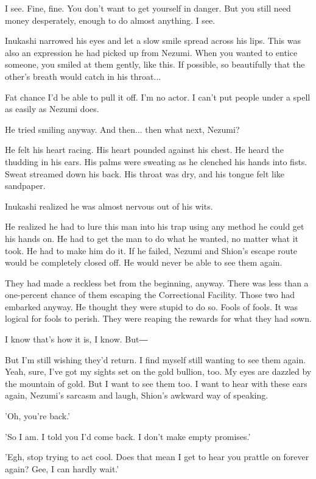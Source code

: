 I see. Fine, fine. You don't want to get yourself in danger. But you
still need money desperately, enough to do almost anything. I see.

Inukashi narrowed his eyes and let a slow smile spread across his lips.
This was also an expression he had picked up from Nezumi. When you
wanted to entice someone, you smiled at them gently, like this. If
possible, so beautifully that the other's breath would catch in his
throat...

Fat chance I'd be able to pull it off. I'm no actor. I can't put people
under a spell as easily as Nezumi does.

He tried smiling anyway. And then... then what next, Nezumi?

He felt his heart racing. His heart pounded against his chest. He heard
the thudding in his ears. His palms were sweating as he clenched his
hands into fists. Sweat streamed down his back. His throat was dry, and
his tongue felt like sandpaper.

Inukashi realized he was almost nervous out of his wits.

He realized he had to lure this man into his trap using any method he
could get his hands on. He had to get the man to do what he wanted, no
matter what it took. He had to make him do it. If he failed, Nezumi and
Shion's escape route would be completely closed off. He would never be
able to see them again.

They had made a reckless bet from the beginning, anyway. There was less
than a one-percent chance of them escaping the Correctional Facility.
Those two had embarked anyway. He thought they were stupid to do so.
Fools of fools. It was logical for fools to perish. They were reaping
the rewards for what they had sown.

I know that's how it is, I know. But―

But I'm still wishing they'd return. I find myself still wanting to see
them again. Yeah, sure, I've got my sights set on the gold bullion, too.
My eyes are dazzled by the mountain of gold. But I want to see them too.
I want to hear with these ears again, Nezumi's sarcasm and laugh,
Shion's awkward way of speaking.

'Oh, you're back.'

'So I am. I told you I'd come back. I don't make empty promises.'

'Egh, stop trying to act cool. Does that mean I get to hear you prattle
on forever again? Gee, I can hardly wait.'

